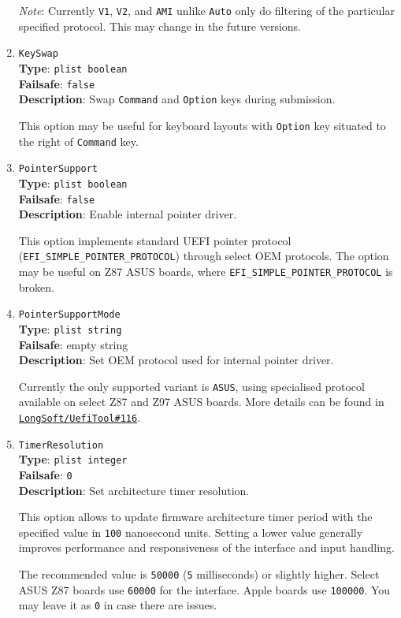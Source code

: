 \documentclass[]{article}
\begin{document}
\begin{enumerate}
  \emph{Note}: Currently \texttt{V1}, \texttt{V2}, and \texttt{AMI} unlike \texttt{Auto} only do filtering of
  the particular specified protocol. This may change in the future versions.

\item
  \texttt{KeySwap}\\
  \textbf{Type}: \texttt{plist\ boolean}\\
  \textbf{Failsafe}: \texttt{false}\\
  \textbf{Description}: Swap \texttt{Command} and \texttt{Option} keys during submission.

  This option may be useful for keyboard layouts with \texttt{Option} key situated to the right
  of \texttt{Command} key.

\item
  \texttt{PointerSupport}\\
  \textbf{Type}: \texttt{plist\ boolean}\\
  \textbf{Failsafe}: \texttt{false}\\
  \textbf{Description}: Enable internal pointer driver.

  This option implements standard UEFI pointer protocol (\texttt{EFI\_SIMPLE\_POINTER\_PROTOCOL})
  through select OEM protocols. The option may be useful on Z87 ASUS boards, where
  \texttt{EFI\_SIMPLE\_POINTER\_PROTOCOL} is broken.

\item
  \texttt{PointerSupportMode}\\
  \textbf{Type}: \texttt{plist\ string}\\
  \textbf{Failsafe}: empty string\\
  \textbf{Description}: Set OEM protocol used for internal pointer driver.

  Currently the only supported variant is \texttt{ASUS}, using specialised protocol available
  on select Z87 and Z97 ASUS boards. More details can be found in
  \href{https://github.com/LongSoft/UEFITool/pull/116}{\texttt{LongSoft/UefiTool\#116}}.

\item
  \texttt{TimerResolution}\\
  \textbf{Type}: \texttt{plist\ integer}\\
  \textbf{Failsafe}: \texttt{0}\\
  \textbf{Description}: Set architecture timer resolution.

  This option allows to update firmware architecture timer period with the specified value
  in \texttt{100} nanosecond units. Setting a lower value generally improves performance
  and responsiveness of the interface and input handling.

  The recommended value is \texttt{50000} (\texttt{5} milliseconds) or slightly higher. Select
  ASUS Z87 boards use \texttt{60000} for the interface. Apple boards use \texttt{100000}.
  You may leave it as \texttt{0} in case there are issues.

\end{enumerate}
\end{document}
